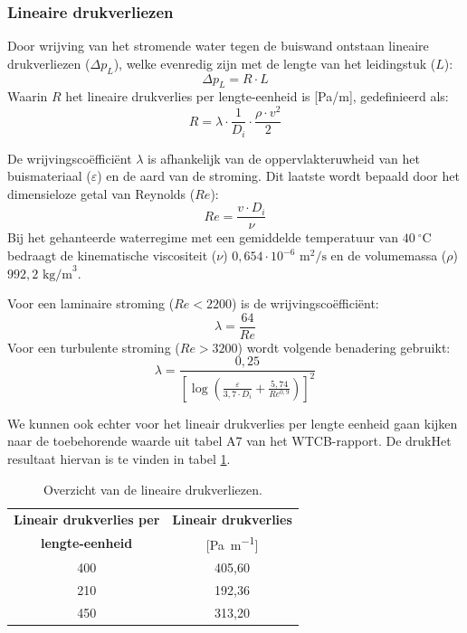 \documentclass[a4paper,12pt]{article}
\begin{document}
\subsubsection{Lineaire drukverliezen}
Door wrijving van het stromende water tegen de buiswand ontstaan lineaire drukverliezen ($\Delta p_L$), welke evenredig zijn met de lengte van het leidingstuk ($L$):
\begin{equation}
    \Delta p_L = R \cdot L
\end{equation}
Waarin $R$ het lineaire drukverlies per lengte-eenheid is [Pa/m], gedefinieerd als:
\begin{equation}
    R = \lambda \cdot \frac{1}{D_i} \cdot \frac{\rho \cdot v^2}{2}
\end{equation}

De wrijvingscoëfficiënt $\lambda$ is afhankelijk van de oppervlakteruwheid van het buismateriaal ($\varepsilon$) en de aard van de stroming. Dit laatste wordt bepaald door het dimensieloze getal van Reynolds ($Re$):
\begin{equation}
    Re = \frac{v \cdot D_i}{\nu}
\end{equation}
Bij het gehanteerde waterregime met een gemiddelde temperatuur van $40~^\circ\text{C}$ bedraagt de kinematische viscositeit ($\nu$) $0,654 \cdot 10^{-6} \text{ m}^2/\text{s}$ en de volumemassa ($\rho$) $992,2 \text{ kg/m}^3$.

Voor een laminaire stroming ($Re < 2200$) is de wrijvingscoëfficiënt:
\begin{equation}
    \lambda = \frac{64}{Re}
\end{equation}
Voor een turbulente stroming ($Re > 3200$) wordt volgende benadering gebruikt:
\begin{equation}
    \lambda = \frac{0,25}{\left[ \log \left( \frac{\varepsilon}{3,7 \cdot D_i} + \frac{5,74}{Re^{0,9}} \right) \right]^2}
\end{equation}

We kunnen ook echter voor het lineair drukverlies per lengte eenheid gaan kijken naar de toebehorende waarde uit tabel A7 van het WTCB-rapport. De drukHet resultaat hiervan is te vinden in tabel \ref{tab:lineaire_drukverliezen}.


\begin{table}[!ht]
    \centering
    \caption{Overzicht van de lineaire drukverliezen.}
    \label{tab:lineaire_drukverliezen}
    \begin{tabular}{cc}
        \toprule
        \rowcolor{gray!20}
        \textbf{Lineair drukverlies per} & \textbf{Lineair drukverlies} \\
        \rowcolor{gray!20}
        \textbf{lengte-eenheid} & [\unit{\pascal\per\meter}] \\
        \midrule
        400 & 405,60 \\
        210 & 192,36 \\
        450 & 313,20 \\
        \bottomrule
    \end{tabular}
\end{table}
\end{document}
